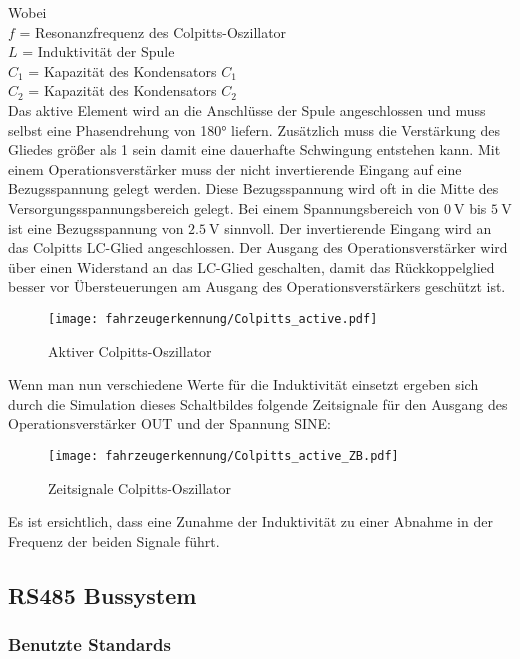 Wobei \\
$f$ = Resonanzfrequenz des Colpitts-Oszillator\\
$L$ = Induktivität der Spule\\
$C_{1}$ = Kapazität des Kondensators $C_{1}$\\
$C_{2}$ = Kapazität des Kondensators $C_{2}$\\

\pagebreak
Das aktive Element wird an die Anschlüsse der Spule angeschlossen und muss selbst eine Phasendrehung von 180° liefern. Zusätzlich muss die Verstärkung des Gliedes größer als 1 sein damit eine dauerhafte 
Schwingung entstehen kann. Mit einem Operationsverstärker muss der nicht invertierende Eingang auf eine Bezugsspannung gelegt werden. Diese Bezugsspannung wird oft in die Mitte des Versorgungsspannungsbereich
gelegt. Bei einem Spannungsbereich von $\SI{0}{\volt}$ bis $\SI{5}{\volt}$ ist eine Bezugsspannung von $\SI{2,5}{\volt}$ sinnvoll. Der invertierende Eingang wird an das Colpitts LC-Glied angeschlossen. Der Ausgang des Operationsverstärker wird über
einen Widerstand an das LC-Glied geschalten, damit das Rückkoppelglied besser vor Übersteuerungen am Ausgang des Operationsverstärkers geschützt ist. 

\begin{figure}[H]
    \centering
    \texttt{[image: fahrzeugerkennung/Colpitts\_active.pdf]}
    \caption{Aktiver Colpitts-Oszillator}
\end{figure}

Wenn man nun verschiedene Werte für die Induktivität einsetzt ergeben sich durch die Simulation dieses Schaltbildes folgende Zeitsignale für den Ausgang des Operationsverstärker OUT und der Spannung SINE:

\begin{figure}[H]
    \centering
    \texttt{[image: fahrzeugerkennung/Colpitts\_active\_ZB.pdf]}
    \caption{Zeitsignale Colpitts-Oszillator}
\end{figure}

Es ist ersichtlich, dass eine Zunahme der Induktivität zu einer Abnahme in der Frequenz der beiden Signale führt.
\pagebreak
\subsection{RS485 Bussystem}
\subsubsection{Benutzte Standards}
